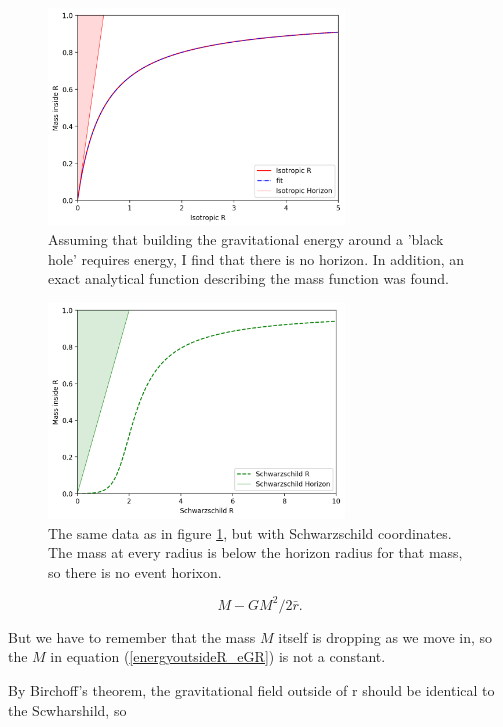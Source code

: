 \documentclass[../rzero]{subfiles}
\begin{document}
\begin{figure}
\includegraphics[width=0.70\textwidth]{chapters/images/no-horizons.png}
\caption{Assuming that building the gravitational energy around a 'black hole' requires energy, I find that there is no horizon. In addition, an exact analytical function describing the mass function was found. }
\label{isotropic-energy-hole}
\end{figure}

\begin{figure}
\includegraphics[width=0.70\textwidth]{chapters/images/no-horizons-s.png}
\caption{The same data as in figure \ref{isotropic-energy-hole}, but with Schwarzschild coordinates. The mass at every radius is below the horizon radius for that mass, so there is no event horixon.}
\label{isotropic-energy-hole-s}
\end{figure}

\begin{equation} \label{energyinsideR}
 M - GM^2/2 \bar r .
\end{equation}

But we have to remember that the mass $M$ itself is dropping as we move in, so the $M$ in equation (\ref{energyoutsideR_eGR}) is not a constant. 

By Birchoff's theorem, the gravitational field outside of r should be identical to the Scwharshild, so
\end{document}
